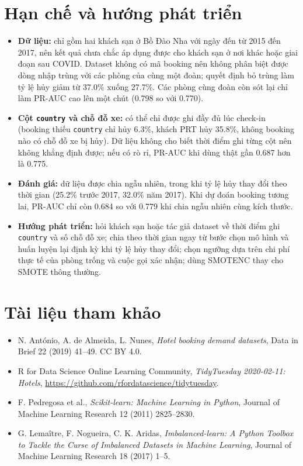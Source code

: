 \section{Hạn chế và hướng phát triển}
\begin{itemize}[leftmargin=1.5cm]
    \item \textbf{Dữ liệu:} chỉ gồm hai khách sạn ở Bồ Đào Nha với ngày đến từ 2015 đến 2017, nên kết quả chưa chắc áp dụng được
          cho khách sạn ở nơi khác hoặc giai đoạn sau COVID. Dataset không có mã booking nên không phân biệt được dòng nhập trùng
          với các phòng của cùng một đoàn; quyết định bỏ trùng làm tỷ lệ hủy giảm từ 37.0\% xuống 27.7\%. Các phòng cùng đoàn còn sót lại
          chỉ làm PR-AUC cao lên một chút (0.798 so với 0.770).
    \item \textbf{Cột \texttt{country} và chỗ đỗ xe:} có thể chỉ được ghi đầy đủ lúc check-in (booking thiếu \texttt{country} chỉ hủy 6.3\%,
          khách PRT hủy 35.8\%, không booking nào có chỗ đỗ xe bị hủy). Dữ liệu không cho biết thời điểm ghi từng cột nên không khẳng định được;
          nếu có rò rỉ, PR-AUC khi dùng thật gần 0.687 hơn là 0.775.
    \item \textbf{Đánh giá:} dữ liệu được chia ngẫu nhiên, trong khi tỷ lệ hủy thay đổi theo thời gian (25.2\% trước 2017, 32.0\% năm 2017).
          Khi dự đoán booking tương lai, PR-AUC chỉ còn 0.684 so với 0.779 khi chia ngẫu nhiên cùng kích thước.
    \item \textbf{Hướng phát triển:} hỏi khách sạn hoặc tác giả dataset về thời điểm ghi \texttt{country} và số chỗ đỗ xe; chia theo thời gian
          ngay từ bước chọn mô hình và huấn luyện lại định kỳ khi tỷ lệ hủy thay đổi; chọn ngưỡng dựa trên chi phí thực tế của phòng trống
          và cuộc gọi xác nhận; dùng SMOTENC thay cho SMOTE thông thường.
\end{itemize}

\section{Tài liệu tham khảo}
\begin{itemize}[leftmargin=1.5cm]
    \item N. António, A. de Almeida, L. Nunes, \textit{Hotel booking demand datasets}, Data in Brief 22 (2019) 41--49. CC BY 4.0.
    \item R for Data Science Online Learning Community, \textit{TidyTuesday 2020-02-11: Hotels},
          \url{https://github.com/rfordatascience/tidytuesday}.
    \item F. Pedregosa et al., \textit{Scikit-learn: Machine Learning in Python}, Journal of Machine Learning Research 12 (2011) 2825--2830.
    \item G. Lemaître, F. Nogueira, C. K. Aridas, \textit{Imbalanced-learn: A Python Toolbox to Tackle the Curse of Imbalanced
          Datasets in Machine Learning}, Journal of Machine Learning Research 18 (2017) 1--5.
\end{itemize}

\fussy
